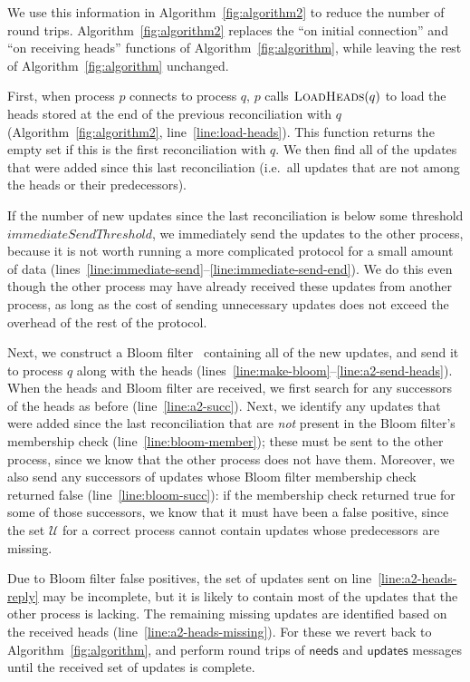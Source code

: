 \documentclass[a4paper,anonymous,USenglish]{lipics-v2019}
\begin{document}
We use this information in Algorithm~\ref{fig:algorithm2} to reduce the number of round trips.
Algorithm~\ref{fig:algorithm2} replaces the ``on initial connection'' and ``on receiving heads'' functions of Algorithm~\ref{fig:algorithm}, while leaving the rest of Algorithm~\ref{fig:algorithm} unchanged.

First, when process $p$ connects to process $q$, $p$ calls $\textsc{LoadHeads}(q)$ to load the heads stored at the end of the previous reconciliation with $q$ (Algorithm~\ref{fig:algorithm2}, line~\ref{line:load-heads}).
This function returns the empty set if this is the first reconciliation with $q$.
We then find all of the updates that were added since this last reconciliation (i.e.\ all updates that are not among the heads or their predecessors).

If the number of new updates since the last reconciliation is below some threshold $\mathit{immediateSendThreshold}$, we immediately send the updates to the other process, because it is not worth running a more complicated protocol for a small amount of data (lines~\ref{line:immediate-send}--\ref{line:immediate-send-end}).
We do this even though the other process may have already received these updates from another process, as long as the cost of sending unnecessary updates does not exceed the overhead of the rest of the protocol.

Next, we construct a Bloom filter~\cite{Bloom:1970} containing all of the new updates, and send it to process $q$ along with the heads (lines~\ref{line:make-bloom}--\ref{line:a2-send-heads}).
When the heads and Bloom filter are received, we first search for any successors of the heads as before (line~\ref{line:a2-succ}).
Next, we identify any updates that were added since the last reconciliation that are \emph{not} present in the Bloom filter's membership check (line~\ref{line:bloom-member}); these must be sent to the other process, since we know that the other process does not have them.
Moreover, we also send any successors of updates whose Bloom filter membership check returned false (line~\ref{line:bloom-succ}): if the membership check returned true for some of those successors, we know that it must have been a false positive, since the set $\mathcal{U}$ for a correct process cannot contain updates whose predecessors are missing.

Due to Bloom filter false positives, the set of updates sent on line~\ref{line:a2-heads-reply} may be incomplete, but it is likely to contain most of the updates that the other process is lacking.
The remaining missing updates are identified based on the received heads (line~\ref{line:a2-heads-missing}).
For these we revert back to Algorithm~\ref{fig:algorithm}, and perform round trips of $\mathsf{needs}$ and $\mathsf{updates}$ messages until the received set of updates is complete.
\end{document}
